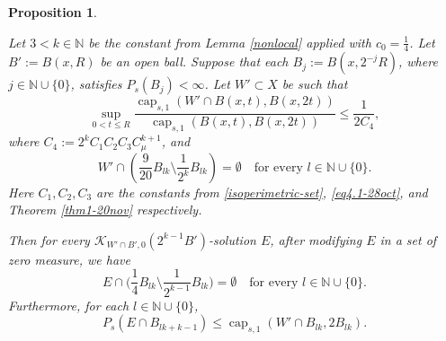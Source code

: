 \documentclass[11pt,leqno]{amsart}
\newtheorem{proposition}[theorem]{Proposition}
\numberwithin{equation}{section}
\theoremstyle{definition}
\DeclareMathOperator{\capp}{cap}
\newcommand{\caps}{\capp_{s,1}}
\begin{document}
	\begin{proposition}\label{empty-intersection}
		
		
		Let 
		$3<k\in\mathbb N$ be the constant from Lemma \ref{nonlocal} applied with $c_0=\frac{1}{4}$.
		Let $B':=B(x,R)$ be an open ball. Suppose that each $B_j:=B(x,2^{-j}R)$, where $j\in\mathbb N\cup\{0\}$, satisfies $P_s(B_j)<\infty$.
		Let $W'\subset X$ be such that 
		\begin{equation*}
			\sup_{0<t\le R} \frac{\caps(W'\cap B(x,t),B(x,2t))}{\caps(B(x,t),B(x,2t))}\le \frac{1}{2C_4},
		\end{equation*}
		where $C_4:=2^{k} C_1C_2C_3C_{\mu}^{k+1}$,
		and
		\begin{equation}\label{eq3.14-23Jan}
			W'\cap \left(\frac{9}{20}B_{lk}\setminus \frac{1}{2^k}B_{lk}\right)=\emptyset 
			\quad \text{for every $l\in \mathbb N\cup \{0\}$}.
		\end{equation}
		Here $C_1,C_2,C_3$ are
		the constants from \eqref{isoperimetric-set}, \eqref{eq4.1-28oct}, and
		Theorem \ref{thm1-20nov} respectively.
		
		Then for every  $\mathcal{K}_{W'\cap B',0}(2^{k-1}B')$-solution $E$, after modifying $E$
		in a set of zero measure, we have
		\begin{equation}\label{eq-empty-intersection}
			E\cap \big(\frac{1}{4}B_{lk}\setminus \frac{1}{2^{k-1}}B_{lk}\big)=\emptyset\quad \text{for every $l\in \mathbb N\cup\{0\}$.}
		\end{equation}
		Furthermore, for each $l\in\mathbb N\cup\{0\}$, 
		\begin{equation}
			P_s(E\cap B_{lk+k-1}) \le
			\caps(W'\cap B_{lk}, 2B_{lk}).
			\label{new-2feb}
		\end{equation}
	\end{proposition}
\end{document}
